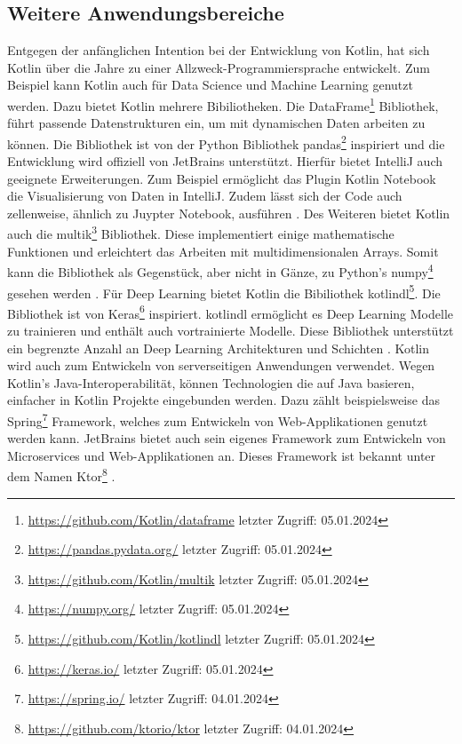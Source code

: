 \documentclass{article}
\begin{document}
\subsection{Weitere Anwendungsbereiche}
Entgegen der anfänglichen Intention bei der Entwicklung von Kotlin, hat sich Kotlin über die Jahre zu einer Allzweck-Programmiersprache entwickelt. Zum Beispiel kann Kotlin auch für Data Science und Machine Learning genutzt werden. Dazu bietet Kotlin mehrere Bibiliotheken. Die DataFrame\footnote{\url{https://github.com/Kotlin/dataframe} letzter Zugriff: 05.01.2024} Bibliothek, führt passende Datenstrukturen ein, um mit dynamischen Daten arbeiten zu können. Die Bibliothek ist von der Python Bibliothek pandas\footnote{\url{https://pandas.pydata.org/} letzter Zugriff: 05.01.2024} inspiriert und die Entwicklung wird offiziell von JetBrains unterstützt. Hierfür bietet IntelliJ auch geeignete Erweiterungen. Zum Beispiel ermöglicht das Plugin Kotlin Notebook die Visualisierung von Daten in IntelliJ. Zudem lässt sich der Code auch zellenweise, ähnlich zu Juypter Notebook, ausführen \cite{KotlinLangDocData}. \newline
Des Weiteren bietet Kotlin auch die multik\footnote{\url{https://github.com/Kotlin/multik} letzter Zugriff: 05.01.2024} Bibliothek. Diese implementiert einige mathematische Funktionen und erleichtert das Arbeiten mit multidimensionalen Arrays. Somit kann die Bibliothek als Gegenstück, aber nicht in Gänze, zu Python's numpy\footnote{\url{https://numpy.org/} letzter Zugriff: 05.01.2024} gesehen werden \cite{KotlinLangDocData}. \newline
Für Deep Learning bietet Kotlin die Bibiliothek kotlindl\footnote{\url{https://github.com/Kotlin/kotlindl} letzter Zugriff: 05.01.2024}. Die Bibliothek ist von Keras\footnote{\url{https://keras.io/} letzter Zugriff: 05.01.2024} inspiriert. kotlindl ermöglicht es Deep Learning Modelle zu trainieren und enthält auch vortrainierte Modelle. Diese Bibliothek unterstützt ein begrenzte Anzahl an Deep Learning Architekturen und Schichten \cite{KotlinLangDocData}. \newline
Kotlin wird auch zum Entwickeln von serverseitigen Anwendungen verwendet. Wegen Kotlin's Java-Interoperabilität, können Technologien die auf Java basieren, einfacher in Kotlin Projekte eingebunden werden. Dazu zählt beispielsweise das Spring\footnote{\url{https://spring.io/} letzter Zugriff: 04.01.2024} Framework, welches zum Entwickeln von Web-Applikationen genutzt werden kann. JetBrains bietet auch sein eigenes Framework zum Entwickeln von Microservices und Web-Applikationen an. Dieses Framework ist bekannt unter dem Namen Ktor\footnote{\url{https://github.com/ktorio/ktor} letzter Zugriff: 04.01.2024} \cite{KotlinLangDocServer}.
\end{document}
